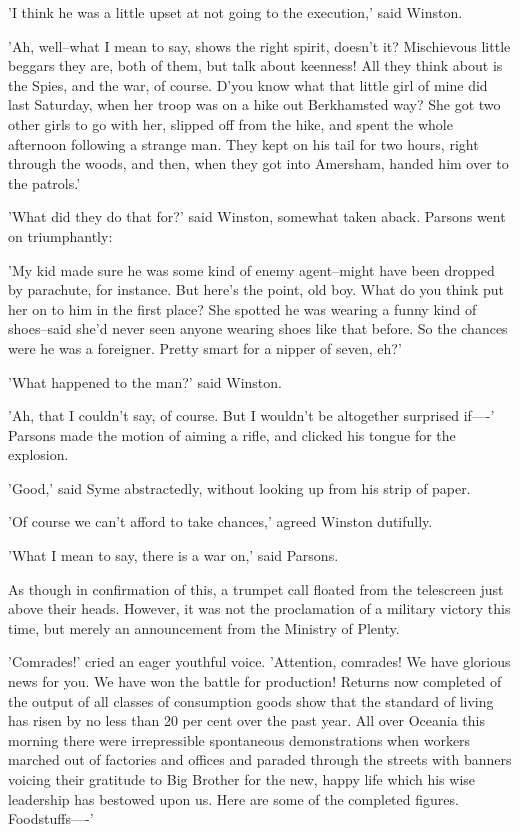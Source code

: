 \documentclass{article}
\begin{document}
'I think he was a little upset at not going to the execution,' said
Winston.

'Ah, well--what I mean to say, shows the right spirit, doesn't it?
Mischievous little beggars they are, both of them, but talk about keenness!
All they think about is the Spies, and the war, of course. D'you know what
that little girl of mine did last Saturday, when her troop was on a hike
out Berkhamsted way? She got two other girls to go with her, slipped off
from the hike, and spent the whole afternoon following a strange man. They
kept on his tail for two hours, right through the woods, and then, when
they got into Amersham, handed him over to the patrols.'

'What did they do that for?' said Winston, somewhat taken aback. Parsons
went on triumphantly:

'My kid made sure he was some kind of enemy agent--might have been dropped
by parachute, for instance. But here's the point, old boy. What do you
think put her on to him in the first place? She spotted he was wearing a
funny kind of shoes--said she'd never seen anyone wearing shoes like that
before. So the chances were he was a foreigner. Pretty smart for a nipper
of seven, eh?'

'What happened to the man?' said Winston.

'Ah, that I couldn't say, of course. But I wouldn't be altogether surprised
if----' Parsons made the motion of aiming a rifle, and clicked his tongue
for the explosion.

'Good,' said Syme abstractedly, without looking up from his strip of paper.

'Of course we can't afford to take chances,' agreed Winston dutifully.

'What I mean to say, there is a war on,' said Parsons.

As though in confirmation of this, a trumpet call floated from the
telescreen just above their heads. However, it was not the proclamation of
a military victory this time, but merely an announcement from the Ministry
of Plenty.

'Comrades!' cried an eager youthful voice. 'Attention, comrades! We have
glorious news for you. We have won the battle for production! Returns now
completed of the output of all classes of consumption goods show that the
standard of living has risen by no less than 20 per cent over the past
year. All over Oceania this morning there were irrepressible spontaneous
demonstrations when workers marched out of factories and offices and
paraded through the streets with banners voicing their gratitude to Big
Brother for the new, happy life which his wise leadership has bestowed
upon us. Here are some of the completed figures. Foodstuffs----'
\end{document}
